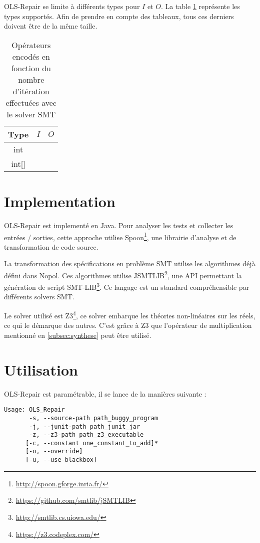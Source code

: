 OLS-Repair se limite à différents types pour $I$ et $O$. La table \ref{table:IO} représente les types supportés. Afin de  prendre en compte des tableaux, tous ces derniers doivent être de la même taille.

\begin{table}[H]
\centering
\begin{tabular}{|c|c|c|}
  \hline
  Type & $I$ & $O$ \\
  \hline
  int 		& \checkmark & \checkmark \\
  int[] 	& \checkmark & \ding{56} \\
  \hline
\end{tabular}

\caption{Opérateurs encodés en fonction du nombre d'itération effectuées avec le solver SMT}
\label{table:IO}
\end{table}


\section{Implementation}
\label{sec:implementation}

\par OLS-Repair est implementé en Java. Pour analyser les tests et collecter les entrées / sorties, cette approche utilise Spoon\footnote{\url{http://spoon.gforge.inria.fr/}}, une librairie d'analyse et de transformation de code source.
\par La transformation des spécifications en problème SMT utilise les algorithmes déjà défini dans Nopol\cite{nopol}. Ces algorithmes utilise JSMTLIB\footnote{\url{https://github.com/smtlib/jSMTLIB}}, une API permettant la génération de script SMT-LIB\footnote{\url{http://smtlib.cs.uiowa.edu/}}. Ce langage est un standard compréhensible par différents solvers SMT.
\par Le solver utilisé est Z3\footnote{\url{https://z3.codeplex.com/}}, ce solver embarque les théories non-linéaires sur les réels, ce qui le démarque des autres. C'est grâce à Z3 que l'opérateur de multiplication mentionné en \ref{subsec:synthese} peut être utilisé.


\section{Utilisation}

OLS-Repair est paramétrable, il se lance de la manières suivante :
\\
\begin{verbatim}
Usage: OLS_Repair
       -s, --source-path path_buggy_program
       -j, --junit-path path_junit_jar
       -z, --z3-path path_z3_executable
      [-c, --constant one_constant_to_add]*
      [-o, --override]
      [-u, --use-blackbox]
\end{verbatim}


	

	
		
		
		